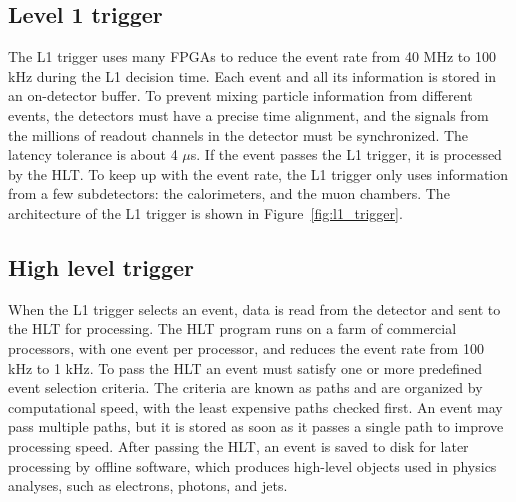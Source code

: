 \subsection{Level 1 trigger}

The L1 trigger uses many FPGAs to reduce the event rate from 40 MHz to 100 kHz during the L1 decision time. Each event and all its information is stored in an on-detector buffer. To prevent mixing particle information from different events, the detectors must have a precise time alignment, and the signals from the millions of readout channels in the detector must be synchronized. The latency tolerance is about 4 $\mu$s. If the event passes the L1 trigger, it is processed by the HLT. To keep up with the event rate, the L1 trigger only uses information from a few subdetectors: the calorimeters, and the muon chambers. The architecture of the L1 trigger is shown in Figure~\ref{fig:l1_trigger}. 

\subsection{High level trigger}

When the L1 trigger selects an event, data is read from the detector and sent to the HLT for processing. The HLT program runs on a farm of commercial processors, with one event per processor, and reduces the event rate from 100 kHz to 1 kHz. To pass the HLT an event must satisfy one or more predefined event selection criteria. The criteria are known as paths and are organized by computational speed, with the least expensive paths checked first. An event may pass multiple paths, but it is stored as soon as it passes a single path to improve processing speed. After passing the HLT, an event is saved to disk for later processing by offline software, which produces high-level objects used in physics analyses, such as electrons, photons, and jets.
